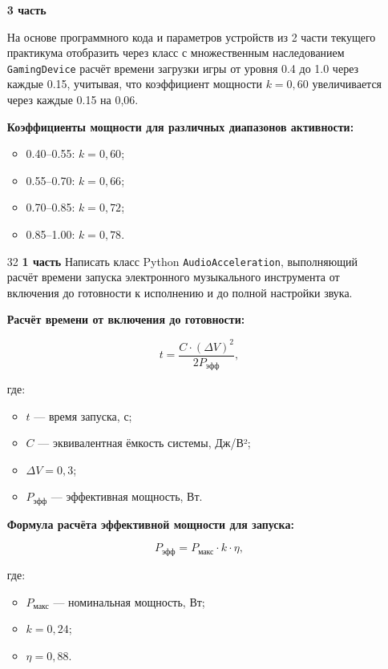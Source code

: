 \begin{enumerate}
\textbf{3 часть}

На основе программного кода и параметров устройств из 2 части текущего практикума отобразить через класс с множественным наследованием \texttt{GamingDevice} расчёт времени загрузки игры от уровня 0.4 до 1.0 через каждые 0.15, учитывая, что коэффициент мощности $k = 0{,}60$ увеличивается через каждые 0.15 на 0{,}06.

\textbf{Коэффициенты мощности для различных диапазонов активности:}
\begin{itemize}
    \item 0.40–0.55: $k = 0{,}60$;  
    \item 0.55–0.70: $k = 0{,}66$;  
    \item 0.70–0.85: $k = 0{,}72$;  
    \item 0.85–1.00: $k = 0{,}78$.  
\end{itemize}


\item[32] \textbf{1 часть}  
Написать класс Python \texttt{AudioAcceleration}, выполняющий расчёт времени запуска электронного музыкального инструмента от включения до готовности к исполнению и до полной настройки звука.

\textbf{Расчёт времени от включения до готовности:}

\begin{equation}
t = \frac{C \cdot (\Delta V)^2}{2P_{\text{эфф}}},
\end{equation}

где:  
\begin{itemize}
    \item $t$ — время запуска, с;  
    \item $C$ — эквивалентная ёмкость системы, Дж/В²;  
    \item $\Delta V = 0{,}3$;  
    \item $P_{\text{эфф}}$ — эффективная мощность, Вт.  
\end{itemize}

\textbf{Формула расчёта эффективной мощности для запуска:}

\begin{equation}
P_{\text{эфф}} = P_{\text{макс}} \cdot k \cdot \eta,
\end{equation}

где:  
\begin{itemize}
    \item $P_{\text{макс}}$ — номинальная мощность, Вт;  
    \item $k = 0{,}24$;  
    \item $\eta = 0{,}88$.  
\end{itemize}


\end{enumerate}
